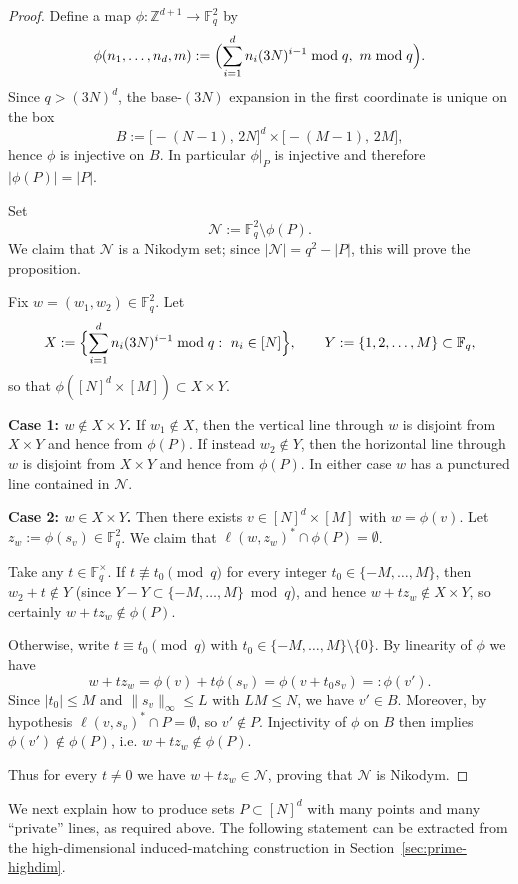 \documentclass[12pt,reqno]{amsart}
\theoremstyle{plain}
\theoremstyle{definition}
\newcommand{\F}{\mathbb{F}}
\newcommand{\Z}{\mathbb{Z}}
\newcommand{\1}{\mathbf{1}}
\begin{document}
\begin{proof}
Define a map $\phi:\Z^{d+1}\to\F_q^2$ by
\[
\phi(n_1,\dots,n_d,m)
:=\Bigl(\sum_{i=1}^d n_i(3N)^{i-1}\bmod q,\ m\bmod q\Bigr).
\]
Since $q>(3N)^d$, the base-$(3N)$ expansion in the first coordinate is unique on the box
\[
B:=\bigl[-(N-1),\,2N\bigr]^d\times\bigl[-(M-1),\,2M\bigr],
\]
hence $\phi$ is injective on $B$. In particular $\phi|_P$ is injective and therefore
$|\phi(P)|=|P|$.

Set
\[
\mathcal{N}:=\F_q^2\setminus \phi(P).
\]
We claim that $\mathcal{N}$ is a Nikodym set; since $|\mathcal{N}|=q^2-|P|$, this will prove the proposition.

Fix $w=(w_1,w_2)\in \F_q^2$. Let
\[
X:=\Bigl\{\sum_{i=1}^d n_i(3N)^{i-1}\bmod q:\ n_i\in[N]\Bigr\},
\qquad
Y:=\{1,2,\dots,M\}\subset \F_q,
\]
so that $\phi([N]^d\times[M])\subset X\times Y$.

\smallskip\noindent
\textbf{Case 1: $w\notin X\times Y$.}
If $w_1\notin X$, then the vertical line through $w$ is disjoint from $X\times Y$ and hence from $\phi(P)$.
If instead $w_2\notin Y$, then the horizontal line through $w$ is disjoint from $X\times Y$ and hence from $\phi(P)$.
In either case $w$ has a punctured line contained in $\mathcal{N}$.

\smallskip\noindent
\textbf{Case 2: $w\in X\times Y$.}
Then there exists $v\in[N]^d\times[M]$ with $w=\phi(v)$.
Let $z_w:=\phi(s_v)\in\F_q^2$. We claim that $\ell(w,z_w)^\ast\cap \phi(P)=\emptyset$.

Take any $t\in\F_q^\times$.
If $t\not\equiv t_0\pmod q$ for every integer $t_0\in\{-M,\dots,M\}$, then
$w_2+t\notin Y$ (since $Y-Y\subset\{-M,\dots,M\}\bmod q$), and hence $w+t z_w\notin X\times Y$,
so certainly $w+t z_w\notin\phi(P)$.

Otherwise, write $t\equiv t_0\pmod q$ with $t_0\in\{-M,\dots,M\}\setminus\{0\}$.
By linearity of $\phi$ we have
\[
w+t z_w=\phi(v)+t\phi(s_v)=\phi(v+t_0 s_v)=:\phi(v').
\]
Since $|t_0|\le M$ and $\|s_v\|_\infty\le L$ with $LM\le N$, we have $v'\in B$.
Moreover, by hypothesis $\ell(v,s_v)^\ast\cap P=\emptyset$, so $v'\notin P$.
Injectivity of $\phi$ on $B$ then implies $\phi(v')\notin\phi(P)$, i.e. $w+t z_w\notin\phi(P)$.

Thus for every $t\neq 0$ we have $w+t z_w\in \mathcal{N}$, proving that $\mathcal{N}$ is Nikodym.
\end{proof}

\medskip

We next explain how to produce sets $P\subset[N]^d$ with many points and many ``private'' lines, as required above.
The following statement can be extracted from the high-dimensional induced-matching construction in Section~\ref{sec:prime-highdim}.
\end{document}
